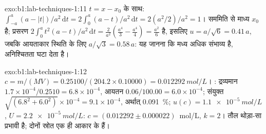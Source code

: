 \begin{solution}{exo:b1:lab-techniques-1:11}
$t = x - x_0$ के साथ: $\int_{-a}^{a} (a - |t|)/a^2 \,\mathrm{d}t =
2 \int_0^a (a - t)/a^2 \,\mathrm{d}t = 2 (a^2/2)/a^2 = 1$। सममिति से माध्य
$x_0$ है; प्रसरण $2 \int_0^a t^2 (a - t)/a^2
\,\mathrm{d}t = \frac{2}{a^2}\left(\frac{a^4}{3} - \frac{a^4}{4}\right) =
\frac{a^2}{6}$ है, इसलिए $u = a/\sqrt6 = 0.41\,a$, जबकि आयताकार स्थिति के लिए
$a/\sqrt3 = 0.58\,a$: यह जानना कि मध्य अधिक संभाव्य है,
अनिश्चितता घटा देता है।
\end{solution}

\begin{solution}{exo:b1:lab-techniques-1:12}
$c = m/(MV) = 0.25100/(204.2 \times 0.10000) = \qty{0.012292}{mol/L}$।
: द्रव्यमान $1.7 \times 10^{-4}/0.2510 = 6.8 \times
10^{-4}$, आयतन $0.06/100.00 = 6.0 \times 10^{-4}$; संयुक्त
$\sqrt{(6.8^2 + 6.0^2)} \times 10^{-4} = 9.1 \times 10^{-4}$, अर्थात्
\qty{0.091}{\percent}; $u(c) = \qty{1.1e-5}{mol/L}$, $U = \qty{2.2e-5}{mol/L}$:
$c = (0.012292 \pm 0.000022)$~mol/L, $k = 2$। तौल थोड़ा-सा
प्रभावी है; दोनों स्रोत एक ही आकार के हैं।
\end{solution}

